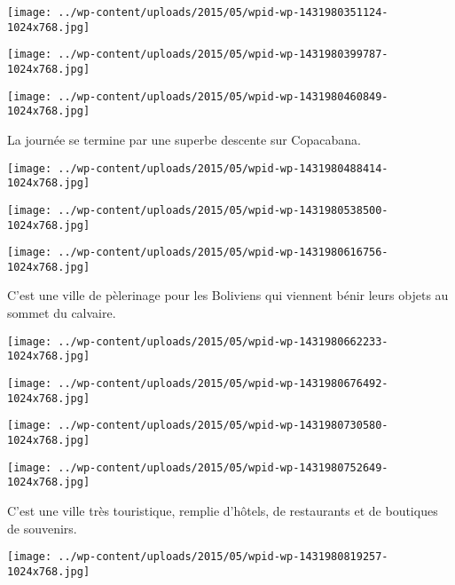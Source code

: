  \newline
\centerline{\texttt{[image: ../wp-content/uploads/2015/05/wpid-wp-1431980351124-1024x768.jpg]} } 
 \newline
 \newline
\centerline{\texttt{[image: ../wp-content/uploads/2015/05/wpid-wp-1431980399787-1024x768.jpg]} } 
 \newline
 \newline
\centerline{\texttt{[image: ../wp-content/uploads/2015/05/wpid-wp-1431980460849-1024x768.jpg]} } 
 \newline
 La journée se termine par une superbe descente sur Copacabana. \newline
 \newline
\centerline{\texttt{[image: ../wp-content/uploads/2015/05/wpid-wp-1431980488414-1024x768.jpg]} } 
 \newline
 \newline
\centerline{\texttt{[image: ../wp-content/uploads/2015/05/wpid-wp-1431980538500-1024x768.jpg]} } 
 \newline
 \newline
\centerline{\texttt{[image: ../wp-content/uploads/2015/05/wpid-wp-1431980616756-1024x768.jpg]} } 
 \newline
 C'est une ville de pèlerinage pour les Boliviens qui viennent bénir leurs objets au sommet du calvaire. \newline
 \newline
\centerline{\texttt{[image: ../wp-content/uploads/2015/05/wpid-wp-1431980662233-1024x768.jpg]} } 
 \newline
 \newline
\centerline{\texttt{[image: ../wp-content/uploads/2015/05/wpid-wp-1431980676492-1024x768.jpg]} } 
 \newline
 \newline
\centerline{\texttt{[image: ../wp-content/uploads/2015/05/wpid-wp-1431980730580-1024x768.jpg]} } 
 \newline
 \newline
\centerline{\texttt{[image: ../wp-content/uploads/2015/05/wpid-wp-1431980752649-1024x768.jpg]} } 
 \newline
 C'est une ville très touristique, remplie d'hôtels, de restaurants et de boutiques de souvenirs. \newline
 \newline
\centerline{\texttt{[image: ../wp-content/uploads/2015/05/wpid-wp-1431980819257-1024x768.jpg]} } 
